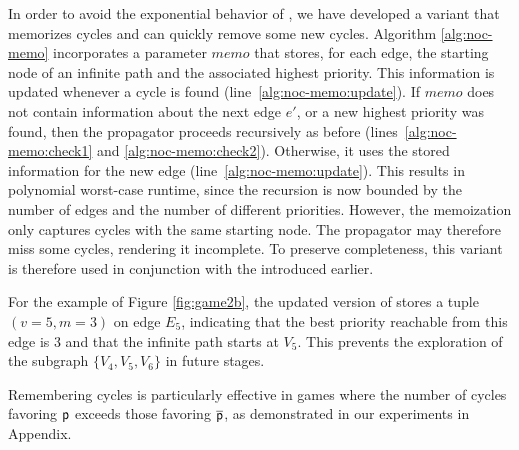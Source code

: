 \documentclass{article}
\begin{document}
In order to avoid the exponential behavior of \noceager, we have developed a variant that memorizes cycles and can quickly remove some new cycles. Algorithm \ref{alg:noc-memo} incorporates a parameter $\textit{memo}$ that stores, for each edge, the starting node of an infinite path and the associated highest priority. This information is updated whenever a cycle is found (line~\ref{alg:noc-memo:update}). If $\textit{memo}$ does not contain information about the next edge $e'$, or a new highest priority was found, then the propagator proceeds recursively as before (lines~\ref{alg:noc-memo:check1} and \ref{alg:noc-memo:check2}). Otherwise, it uses the stored information for the new edge (line~\ref{alg:noc-memo:update}). 
This results in polynomial worst-case runtime, since the recursion is now bounded by the number of edges and the number of different priorities. However, the memoization only captures cycles with the same starting node. The propagator may therefore miss some cycles, rendering it incomplete. To preserve completeness, this variant is therefore used in conjunction with the \nocchecker introduced earlier.

For the example of Figure \ref{fig:game2b}, the updated version of \noc stores a tuple $(v=5, m=3)$ on edge $E_5$, indicating that the best priority reachable from this edge is 3 and that the infinite path starts at $V_5$. This prevents the exploration of the subgraph $\{V_4, V_5, V_6\}$ in future stages. %

Remembering cycles is particularly effective in games where the number of cycles favoring $\player$ exceeds those favoring $\opponent$, as demonstrated in our experiments in Appendix.
\end{document}
